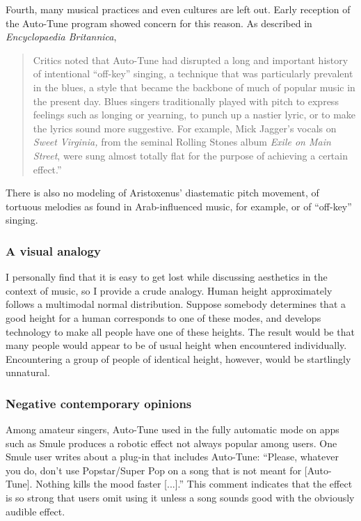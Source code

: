 Fourth, many musical practices and even cultures are left out. Early reception of the Auto-Tune program showed concern for this reason. As described in \textit{Encyclopaedia Britannica}, 
\begin{quotation}Critics noted that Auto-Tune had disrupted a long and important history of intentional ``off-key'' singing, a technique that was particularly prevalent in the blues, a style that became the backbone of much of popular music in the present day. Blues singers traditionally played with pitch to express feelings such as longing or yearning, to punch up a nastier lyric, or to make the lyrics sound more suggestive. For example, Mick Jagger’s vocals on \textit{Sweet Virginia,} from the seminal Rolling Stones album \textit{Exile on Main Street}, were sung almost totally flat for the purpose of achieving a certain effect.'' \cite{autotuneBritannica}
\end{quotation} 
There is also no modeling of Aristoxenus' diastematic pitch movement, of tortuous melodies as found in Arab-influenced music, for example, or of ``off-key'' singing.

\subsubsection{A visual analogy}
I personally find that it is easy to get lost while discussing aesthetics in the context of music, so I provide a crude analogy. Human height approximately follows a multimodal normal distribution. Suppose somebody determines that a good height for a human corresponds to one of these modes, and develops technology to make all people have one of these heights. The result would be that many people would appear to be of usual height when encountered individually. Encountering a group of people of identical height, however, would be startlingly unnatural. 

\subsubsection{Negative contemporary opinions}
Among amateur singers, Auto-Tune used in the fully automatic mode on apps such as Smule produces a robotic effect not always popular among users. One Smule user writes about a plug-in that includes Auto-Tune: ``Please, whatever you do, don’t use Popstar/Super Pop on a song that is not meant for [Auto-Tune]. Nothing kills the mood faster [...].'' \cite{smule-blog} This comment indicates that the effect is so strong that users omit using it unless a song sounds good with the obviously audible effect. 

